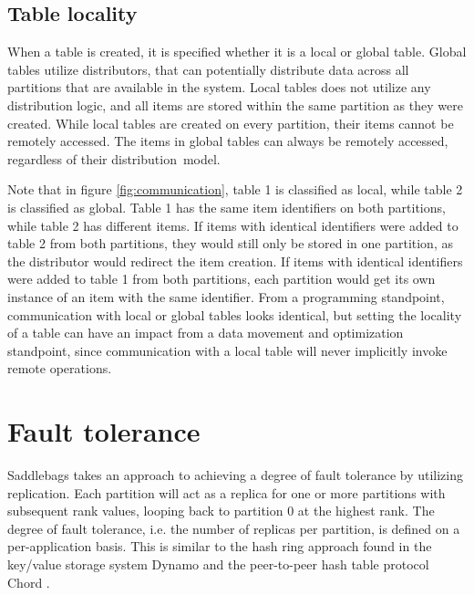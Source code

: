 \documentclass{uit-report}
\begin{document}
\subsection{Table locality}
When a table is created, it is specified whether it is a local or global table. Global tables utilize distributors, that can potentially distribute data across all partitions that are available in the system. Local tables does not utilize any distribution logic, and all items are stored within the same partition as they were created. While local tables are created on every partition, their items cannot be remotely accessed. The items in global tables can always be remotely accessed, regardless of their distribution~model.

Note that in figure \ref{fig:communication}, table 1 is classified as local, while table 2 is classified as global. Table 1 has the same item identifiers on both partitions, while table 2 has different items. If items with identical identifiers were added to table 2 from both partitions, they would still only be stored in one partition, as the distributor would redirect the item creation. If items with identical identifiers were added to table 1 from both partitions, each partition would get its own instance of an item with the same identifier. From a programming standpoint, communication with local or global tables looks identical, but setting the locality of a table can have an impact from a data movement and optimization standpoint, since communication with a local table will never implicitly invoke remote operations.




\section{Fault tolerance}
Saddlebags takes an approach to achieving a degree of fault tolerance by utilizing replication. Each partition will act as a replica for one or more partitions with subsequent rank values, looping back to partition 0 at the highest rank. The degree of fault tolerance, i.e. the number of replicas per partition, is defined on a per-application basis. This is similar to the hash ring approach found in the key/value storage system Dynamo \cite{dynamo} and the peer-to-peer hash table protocol Chord \cite{chord}.
\end{document}

